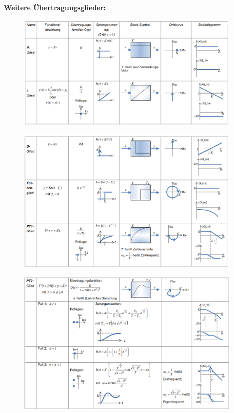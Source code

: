 \documentclass[10pt,a4paper]{article}
\begin{document}
\textbf{Weitere Übertragungsglieder:}
\begin{figure}[H]
	\includegraphics[width=1\columnwidth]{imgs/bb2_2a.png}
\end{figure}
\begin{figure}[H]
	\includegraphics[width=1\columnwidth]{imgs/bb2_2b.png}
\end{figure}
\begin{figure}[H]
	\includegraphics[width=1\columnwidth]{imgs/bb2_2c.png}
\end{figure}
\end{document}
